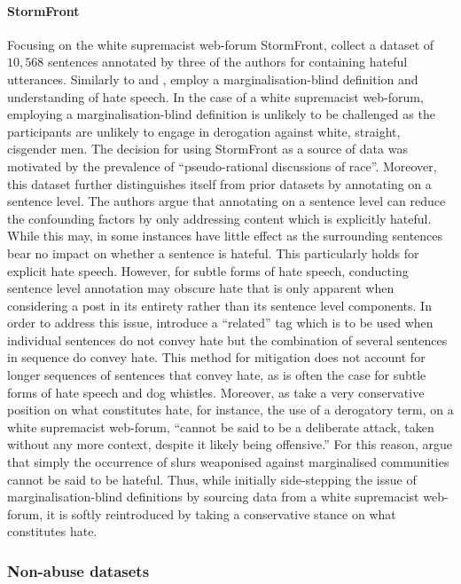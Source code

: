 \paragraph*{StormFront} Focusing on the white supremacist web-forum StormFront, \citet{Garcia:2019} collect a dataset of $10,568$ sentences annotated by three of the authors for containing hateful utterances. Similarly to \citet{Davidson:2017} and \citet{Wulczyn:2016}, \citet{Garcia:2019} employ a marginalisation-blind definition and understanding of hate speech. In the case of a white supremacist web-forum, employing a marginalisation-blind definition is unlikely to be challenged as the participants are unlikely to engage in derogation against white, straight, cisgender men.
The decision for using StormFront as a source of data was motivated by the prevalence of ``pseudo-rational discussions of race''.
Moreover, this dataset further distinguishes itself from prior datasets by annotating on a sentence level.
The authors argue that annotating on a sentence level can reduce the confounding factors by only addressing content which is explicitly hateful.
While this may, in some instances have little effect as the surrounding sentences bear no impact on whether a sentence is hateful. This particularly holds for explicit hate speech.
However, for subtle forms of hate speech, conducting sentence level annotation may obscure hate that is only apparent when considering a post in its entirety rather than its sentence level components. In order to address this issue, \citet{Garcia:2019} introduce a ``related'' tag which is to be used when individual sentences do not convey hate but the combination of several sentences in sequence do convey hate.
This method for mitigation does not account for longer sequences of sentences that convey hate, as is often the case for subtle forms of hate speech and dog whistles.
Moreover, as \citet{Garcia:2019} take a very conservative position on what constitutes hate, for instance, the use of a derogatory term, on a white supremacist web-forum, ``cannot be said to be a deliberate attack, taken without any more context, despite it likely being offensive.'' For this reason, \citet{Garcia:2019} argue that simply the occurrence of slurs weaponised against marginalised communities cannot be said to be hateful.
Thus, while initially side-stepping the issue of marginalisation-blind definitions by sourcing data from a white supremacist web-forum, it is softly reintroduced by taking a conservative stance on what constitutes hate.

\subsubsection{Non-abuse datasets}\label{sec:mtl_data}

